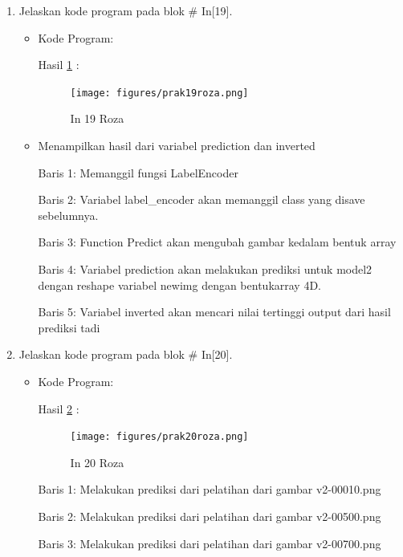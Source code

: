 \begin{enumerate}
\item Jelaskan kode program pada blok \# In[19].
\begin{itemize}
\item Kode Program:

\par Hasil \ref{in19roza} :
\begin{figure}[!hbtp]
\centering
\texttt{[image: figures/prak19roza.png]}
\caption{In 19 Roza}
\label{in19roza}
\end{figure}
\item Menampilkan hasil dari variabel prediction dan inverted
\par Baris 1: Memanggil fungsi LabelEncoder
\par Baris 2: Variabel label\_encoder akan memanggil class yang disave sebelumnya.
\par Baris 3: Function Predict akan mengubah gambar kedalam bentuk array
\par Baris 4: Variabel prediction akan melakukan prediksi untuk model2 dengan reshape variabel newimg dengan bentukarray 4D.
\par Baris 5: Variabel inverted akan mencari nilai tertinggi output dari hasil prediksi tadi
\end{itemize}
\par

\item Jelaskan kode program pada blok \# In[20].
\begin{itemize}
\item Kode Program:

\par Hasil \ref{in20roza} :
\begin{figure}[!hbtp]
\centering
\texttt{[image: figures/prak20roza.png]}
\caption{In 20 Roza}
\label{in20roza}
\end{figure}
\par Baris 1: Melakukan prediksi dari pelatihan dari gambar v2-00010.png
\par Baris 2: Melakukan prediksi dari pelatihan dari gambar v2-00500.png
\par Baris 3: Melakukan prediksi dari pelatihan dari gambar v2-00700.png 
\end{itemize}
\par


\end{enumerate}

